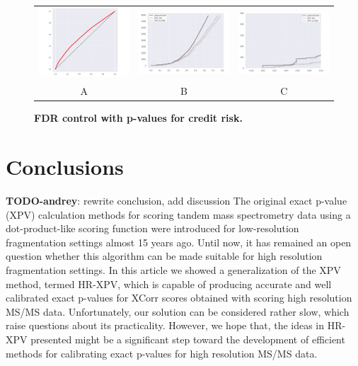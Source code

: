 \documentclass{article}
\newcommand{\todo}[2]{{\color{red} {\bf TODO-#1}: #2}}
\begin{document}
\begin{figure}
	\centering
	\begin{tabular}{ccc}
 		\includegraphics[width=2in]{img/tinkoff_QQ.jpeg} &
		\includegraphics[width=2in]{img/tinkoff_fdr_control.png} & 
            \includegraphics[width=2in]{img/tinkoff_fdr_control_loc.png}
		\\	
		A & B & C
	\end{tabular}
	\caption{\bf FDR control with p-values for credit risk.}
	\label{fig:credit risk}
\end{figure} 

\section{Conclusions}
\todo{andrey}{rewrite conclusion, add discussion}
The original exact p-value (XPV) calculation methods for scoring tandem mass spectrometry data using a dot-product-like scoring function were introduced for low-resolution fragmentation settings almost 15 years ago. Until now, it has remained an open question whether this algorithm can be made suitable for high resolution fragmentation settings. In this article we showed a generalization of the XPV method, termed HR-XPV, which is capable of producing accurate and well calibrated exact p-values for XCorr scores obtained with scoring high resolution MS/MS data. Unfortunately, our solution can be considered rather slow, which raise questions about its practicality. However, we hope that, the ideas in HR-XPV presented might be a significant step toward the development of efficient methods for calibrating exact p-values for high resolution MS/MS data. 
\end{document}
